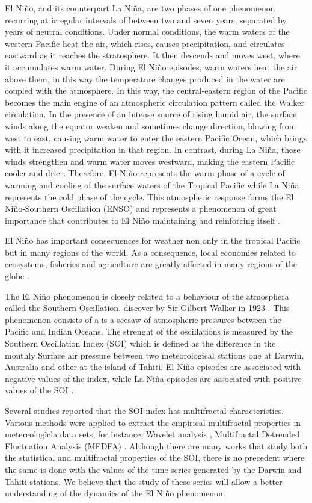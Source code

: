 \documentclass[onecolumn, preprint,aps,amsmath, amssymb, superscriptaddress]{revtex4}
\begin{document}
El Niño, and its counterpart La Niña, are two phases of one phenomenon recurring at irregular intervals of between two and seven years, separated by years of neutral conditions.
Under normal conditions, the warm waters of the western Pacific heat the air, which rises, causes precipitation, and circulates eastward as it reaches the stratosphere. It then descends and moves west, where it accumulates warm water.
During El Niño episodes, warm waters heat the air above them, in this way the temperature changes produced in the water are coupled with the atmosphere. In this way, the central-eastern region of the Pacific becomes the main engine of an atmospheric circulation pattern called the Walker circulation.
In the presence of an intense source of rising humid air, the surface winds along the equator weaken and sometimes change direction, blowing from west to east, causing warm water to enter the eastern Pacific Ocean, which brings with it increased precipitation in that region.
In contrast, during La Niña, those winds strengthen and warm water moves westward, making the eastern Pacific cooler and drier. Therefore, El Niño represents the warm phase of a cycle of warming and cooling of the surface waters of the Tropical Pacific while La Niña represents the cold phase of the cycle.
This atmospheric response forms the El Niño-Southern Oscillation (ENSO) and represents a phenomenon of great importance that contributes to El Niño maintaining and reinforcing itself \cite{Philander}.

El Niño has important consequences for weather non only in the tropical Pacific but in many regions of the world. As a consequence, local economies related to ecosystems, fisheries and agriculture are greatly affected in many regions of the globe \cite{Glantz}.

The El Niño phenomenon is closely related to a behaviour of the atmosphera called the Southern Oscillation, discover by Sir Gilbert Walker in 1923 \cite{Walker}. This phenomenon consists of a is a seesaw of atmospheric pressures between the Pacific and Indian Oceans. The strenght of the oscillations is measured by the Southern Oscillation Index (SOI) which is defined as the difference in the monthly Surface air pressure between two meteorological stations one at Darwin, Australia and other at the island of Tahiti. El Ni\~no episodes are associated with negative values of the index, while La Ni\~na episodes are associated with positive values of the SOI \cite{Sarachik}.

Several studies reported that the SOI index has multifractal characteristics. Various methods were applied to extract the empirical multifractal properties in metereologicla data sets, for instance, Wavelet analysis \cite{Maruyama_1, Maruyama_2}, Multifractal Detrended Fluctuation Analysis (MFDFA) \cite{Varotsos}. Although there are many works that study both the statistical and multifractal properties of the SOI, there is no precedent where the same is done with the values of the time series generated by the Darwin and Tahiti stations. We believe that the study of these series will allow a better understanding of the dynamics of the El Ni\~no phenomenon.
\end{document}
